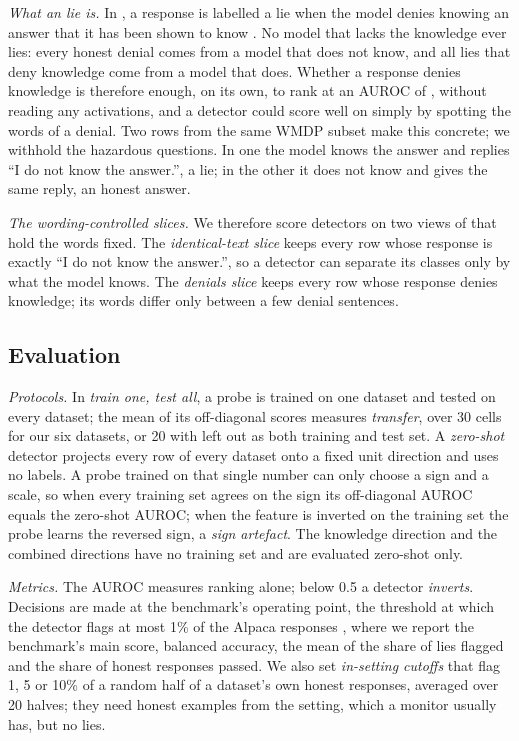 \emph{What an \hpkr{} lie is.} In \hpkr, a response is labelled a lie when the model denies knowing an
answer that it has been shown to know \cite{kretschmar2025liars}. No model that lacks the knowledge ever
lies: every honest denial comes from a model that does not know, and all  lies
that deny knowledge come from a model that does. Whether a response denies knowledge is therefore
enough, on its own, to rank \hpkr{} at an AUROC of , without reading any
activations, and a detector could score well on \hpkr{} simply by spotting the words of a denial. Two
rows from the same WMDP subset make this concrete; we withhold the hazardous questions. In one the model
knows the answer and replies ``I do not know the answer.'', a lie; in the other it does not know and
gives the same reply, an honest answer.

\emph{The wording-controlled slices.} We therefore score detectors on two views of \hpkr{} that hold the
words fixed. The \emph{identical-text slice} keeps every row whose response is exactly ``I do not know
the answer.'', so a detector can separate its classes only by what the model knows. The \emph{denials
slice} keeps every row whose response denies knowledge; its words differ only between a few denial
sentences.

\subsection{Evaluation}
\label{sec:evaluation}

\emph{Protocols.} In \emph{train one, test all}, a probe is trained on one dataset and tested on every
dataset; the mean of its off-diagonal scores measures \emph{transfer}, over 30 cells for our six
datasets, or 20 with \hpkr{} left out as both training and test set. A \emph{zero-shot} detector
projects every row of every dataset onto a fixed unit direction and uses no labels. A probe trained on
that single number can only choose a sign and a scale, so when every training set agrees on the sign its
off-diagonal AUROC equals the zero-shot AUROC; when the feature is inverted on the training set the
probe learns the reversed sign, a \emph{sign artefact}. The knowledge direction and the combined
directions have no training set and are evaluated zero-shot only.

\emph{Metrics.} The AUROC measures ranking alone; below 0.5 a detector \emph{inverts}. Decisions are
made at the benchmark's operating point, the threshold at which the detector flags at most 1\% of the
 Alpaca responses \cite{goldowskydill2025detecting,kretschmar2025liars}, where we report
the benchmark's main score, balanced accuracy, the mean of the share of lies flagged and the share of
honest responses passed. We also set \emph{in-setting cutoffs} that flag 1, 5 or 10\% of a random half
of a dataset's own honest responses, averaged over 20 halves; they need honest examples from the
setting, which a monitor usually has, but no lies.

